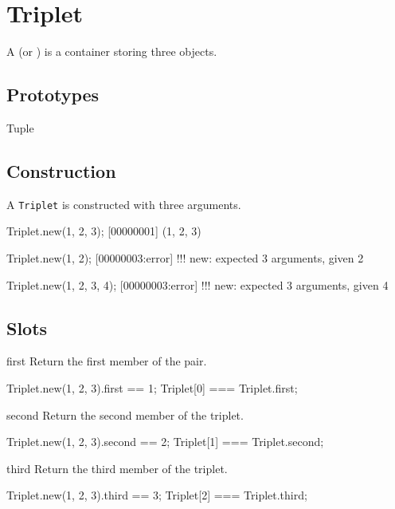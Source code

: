 
\section{Triplet}

A  (or ) is a container storing three
objects.


\subsection{Prototypes}
\begin{refObjects}
\item[Tuple]
\end{refObjects}

\subsection{Construction}

A \lstinline|Triplet| is constructed with three arguments.

\begin{urbiscript}[firstnumber=1]
Triplet.new(1, 2, 3);
[00000001] (1, 2, 3)

Triplet.new(1, 2);
[00000003:error] !!! new: expected 3 arguments, given 2

Triplet.new(1, 2, 3, 4);
[00000003:error] !!! new: expected 3 arguments, given 4
\end{urbiscript}

\subsection{Slots}
\begin{urbiscriptapi}
\item[first]
  Return the first member of the pair.
\begin{urbiassert}
Triplet.new(1, 2, 3).first == 1;
Triplet[0] === Triplet.first;
\end{urbiassert}


\item[second]
  Return the second member of the triplet.
\begin{urbiassert}
Triplet.new(1, 2, 3).second == 2;
Triplet[1] === Triplet.second;
\end{urbiassert}


\item[third]
  Return the third member of the triplet.
\begin{urbiassert}
Triplet.new(1, 2, 3).third == 3;
Triplet[2] === Triplet.third;
\end{urbiassert}
\end{urbiscriptapi}



